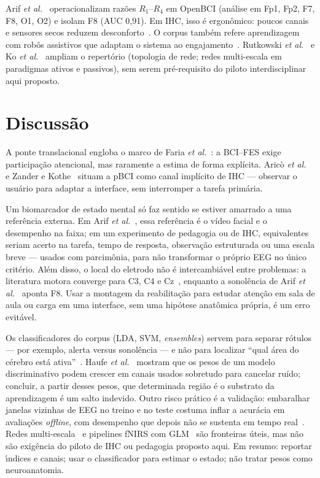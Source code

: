 \documentclass[12pt]{article}
\begin{document}
Arif \textit{et al.}~\cite{Arif2023} operacionalizam raz\~{o}es $R_1$--$R_4$ em OpenBCI (an\'{a}lise em Fp1, Fp2, F7, F8, O1, O2) e isolam F8 (AUC 0{,}91). Em IHC, isso \'{e} ergon\^{o}mico: poucos canais e sensores secos reduzem desconforto~\cite{Arico2017,Arif2023}. O corpus tamb\'{e}m refere aprendizagem com rob\^{o}s assistivos que adaptam o sistema ao engajamento~\cite{Arif2023}. Rutkowski \textit{et al.}~\cite{Rutkowski2023} e Ko \textit{et al.}~\cite{Ko2021} ampliam o repert\'{o}rio (topologia de rede; redes multi-escala em paradigmas ativos e passivos), sem serem pr\'{e}-requisito do piloto interdisciplinar aqui proposto.

\section{Discuss\~{a}o}

A ponte translacional engloba o marco de Faria \textit{et al.}~\cite{Faria2026}: a BCI--FES exige participa\c{c}\~{a}o atencional, mas raramente a estima de forma expl\'{i}cita. Aric\`{o} \textit{et al.}~\cite{Arico2017} e Zander e Kothe~\cite{Zander2016} situam a pBCI como canal impl\'{i}cito de IHC --- observar o usu\'{a}rio para adaptar a interface, sem interromper a tarefa prim\'{a}ria.

Um biomarcador de estado mental s\'{o} faz sentido se estiver amarrado a uma refer\^{e}ncia externa. Em Arif \textit{et al.}~\cite{Arif2023}, essa refer\^{e}ncia \'{e} o v\'{i}deo facial e o desempenho na faixa; em um experimento de pedagogia ou de IHC, equivalentes seriam acerto na tarefa, tempo de resposta, observa\c{c}\~{a}o estruturada ou uma escala breve --- usados com parcim\^{o}nia, para n\~{a}o transformar o pr\'{o}prio EEG no \'{u}nico crit\'{e}rio. Al\'{e}m disso, o local do eletrodo n\~{a}o \'{e} intercambi\'{a}vel entre problemas: a literatura motora converge para C3, C4 e Cz~\cite{Faria2026}, enquanto a sonol\^{e}ncia de Arif \textit{et al.}~\cite{Arif2023} aponta F8. Usar a montagem da reabilita\c{c}\~{a}o para estudar aten\c{c}\~{a}o em sala de aula ou carga em uma interface, sem uma hip\'{o}tese anat\^{o}mica pr\'{o}pria, \'{e} um erro evit\'{a}vel.

Os classificadores do corpus (LDA, SVM, \textit{ensembles}) servem para separar r\'{o}tulos --- por exemplo, alerta versus sonol\^{e}ncia --- e n\~{a}o para localizar ``qual \'{a}rea do c\'{e}rebro est\'{a} ativa''~\cite{Arico2017,Lotte2018}. Haufe \textit{et al.}~\cite{Haufe2014} mostram que os pesos de um modelo discriminativo podem crescer em canais usados sobretudo para cancelar ru\'{i}do; concluir, a partir desses pesos, que determinada regi\~{a}o \'{e} o substrato da aprendizagem \'{e} um salto indevido. Outro risco pr\'{a}tico \'{e} a valida\c{c}\~{a}o: embaralhar janelas vizinhas de EEG no treino e no teste costuma inflar a acur\'{a}cia em avalia\c{c}\~{o}es \textit{offline}, com desempenho que depois n\~{a}o se sustenta em tempo real~\cite{Arico2017,Varoquaux2017}. Redes multi-escala~\cite{Ko2021} e pipelines fNIRS com GLM~\cite{Boas2020} s\~{a}o fronteiras \'{u}teis, mas n\~{a}o s\~{a}o exig\^{e}ncia do piloto de IHC ou pedagogia proposto aqui. Em resumo: reportar \'{\i}ndices e canais; usar o classificador para estimar o estado; n\~{a}o tratar pesos como neuroanatomia.
\end{document}
